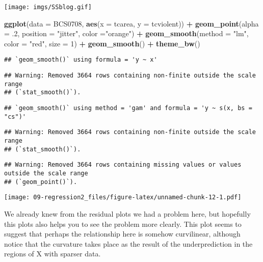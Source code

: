 \documentclass[
]{book}
\newenvironment{Shaded}{\begin{snugshade}}{\end{snugshade}}
\newcommand{\AttributeTok}[1]{\textcolor[rgb]{0.13,0.29,0.53}{#1}}
\newcommand{\DecValTok}[1]{\textcolor[rgb]{0.00,0.00,0.81}{#1}}
\newcommand{\FunctionTok}[1]{\textcolor[rgb]{0.13,0.29,0.53}{\textbf{#1}}}
\newcommand{\NormalTok}[1]{#1}
\newcommand{\SpecialCharTok}[1]{\textcolor[rgb]{0.81,0.36,0.00}{\textbf{#1}}}
\newcommand{\StringTok}[1]{\textcolor[rgb]{0.31,0.60,0.02}{#1}}
\begin{document}
\texttt{[image: imgs/SSblog.gif]}

\begin{Shaded}
\begin{Highlighting}[]
\FunctionTok{ggplot}\NormalTok{(}\AttributeTok{data =}\NormalTok{ BCS0708, }\FunctionTok{aes}\NormalTok{(}\AttributeTok{x =}\NormalTok{ tcarea, }\AttributeTok{y =}\NormalTok{ tcviolent)) }\SpecialCharTok{+}
  \FunctionTok{geom\_point}\NormalTok{(}\AttributeTok{alpha =}\NormalTok{ .}\DecValTok{2}\NormalTok{, }\AttributeTok{position =} \StringTok{"jitter"}\NormalTok{, }\AttributeTok{color =}\StringTok{"orange"}\NormalTok{) }\SpecialCharTok{+}
  \FunctionTok{geom\_smooth}\NormalTok{(}\AttributeTok{method =} \StringTok{"lm"}\NormalTok{, }\AttributeTok{color =} \StringTok{"red"}\NormalTok{, }\AttributeTok{size =} \DecValTok{1}\NormalTok{) }\SpecialCharTok{+}
  \FunctionTok{geom\_smooth}\NormalTok{() }\SpecialCharTok{+}
  \FunctionTok{theme\_bw}\NormalTok{()}
\end{Highlighting}
\end{Shaded}

\begin{verbatim}
## `geom_smooth()` using formula = 'y ~ x'
\end{verbatim}

\begin{verbatim}
## Warning: Removed 3664 rows containing non-finite outside the scale range
## (`stat_smooth()`).
\end{verbatim}

\begin{verbatim}
## `geom_smooth()` using method = 'gam' and formula = 'y ~ s(x, bs = "cs")'
\end{verbatim}

\begin{verbatim}
## Warning: Removed 3664 rows containing non-finite outside the scale range
## (`stat_smooth()`).
\end{verbatim}

\begin{verbatim}
## Warning: Removed 3664 rows containing missing values or values outside the scale range
## (`geom_point()`).
\end{verbatim}

\texttt{[image: 09-regression2\_files/figure-latex/unnamed-chunk-12-1.pdf]}

We already knew from the residual plots we had a problem here, but hopefully this plots also helps you to see the problem more clearly. This plot seems to suggest that perhaps the relationship here is somehow curvilinear, although notice that the curvature takes place as the result of the underprediction in the regions of X with sparser data.
\end{document}
